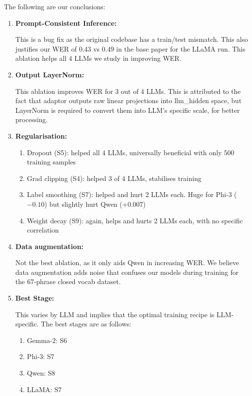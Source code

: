 The following are our conclusions:

\begin{enumerate}
    \item \textbf{Prompt-Consistent Inference:}

This is a bug fix as the original codebase has a train/test mismatch. This also justifies our WER of 0.43 vs 0.49 in the base paper for the LLaMA run. This ablation helps all 4 LLMs we study in improving WER.

    \item \textbf{Output LayerNorm:}

This ablation improves WER for 3 out of 4 LLMs. This is attributed to the fact that adaptor outputs raw linear projections into llm\_hidden space, but LayerNorm is required to convert them into LLM's specific scale, for better processing.

    \item \textbf{Regularisation:}
    \begin{enumerate}
        \item[i.] Dropout (S5): helped all 4 LLMs, universally beneficial with only 500 training samples
        \item[ii.] Grad clipping (S4): helped 3 of 4 LLMs, stabilises training
        \item[iii.] Label smoothing (S7): helped and hurt 2 LLMs each. Huge for Phi-3 ($-0.10$) but slightly hurt Qwen ($+0.007$)
        \item[iv.] Weight decay (S9): again, helps and hurts 2 LLMs each, with no specific correlation
    \end{enumerate}

    \item \textbf{Data augmentation:}

Not the best ablation, as it only aids Qwen in increasing WER. We believe data augmentation adds noise that confuses our models during training for the 67-phrase closed vocab dataset.

    \item \textbf{Best Stage:}

This varies by LLM and implies that the optimal training recipe is LLM-specific. The best stages are as follows:
    \begin{enumerate}
        \item[i.] Gemma-2: S6
        \item[ii.] Phi-3: S7
        \item[iii.] Qwen: S8
        \item[iv.] LLaMA: S7
    \end{enumerate}
\end{enumerate}

